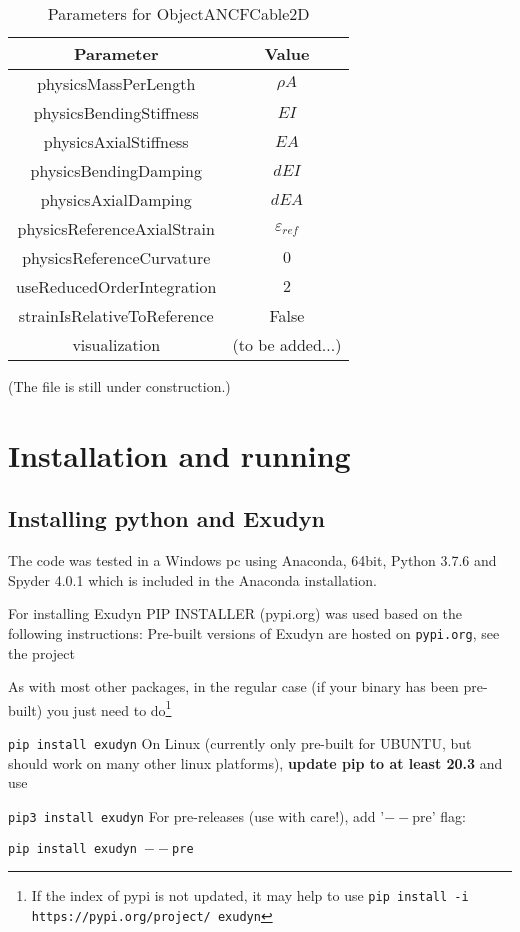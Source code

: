 %
\begin{table}
    \caption{Parameters for ObjectANCFCable2D} \label{tab:ObjectANCFCable2D}
    \centering
    \begin{tabular}{c|c} \hline
        Parameter & Value \\ \hline 
        physicsMassPerLength & $\rho A$\\
        physicsBendingStiffness & $EI$\\
        physicsAxialStiffness & $EA$\\
        physicsBendingDamping & $dEI$\\
        physicsAxialDamping & $dEA$\\
        physicsReferenceAxialStrain  & $\varepsilon_{ref}$\\
        physicsReferenceCurvature & $0$\\
        useReducedOrderIntegration & $2$\\
        strainIsRelativeToReference & False\\
        visualization & (to be added...)\\ \hline
    \end{tabular}
\end{table}
\ei
(The file is still under construction.)
\section{Installation and running}
\subsection{Installing python and Exudyn}
The code was tested in a Windows pc using Anaconda, 64bit, Python 3.7.6 and Spyder 4.0.1 which is included in the Anaconda installation.

For installing Exudyn PIP INSTALLER (pypi.org) was used based on the following instructions:
Pre-built versions of Exudyn are hosted on \texttt{pypi.org}, see the project
\bi
 \item {}
\ei
As with most other packages, in the regular case (if your binary has been pre-built) you just need to do\footnote{If the index of pypi is not updated, it may help to use \texttt{pip install -i https://pypi.org/project/ exudyn} }
\bi
  \item[] \texttt{pip install exudyn}
\ei
On Linux (currently only pre-built for UBUNTU, but should work on many other linux platforms), {\bf update pip to at least 20.3} and use 
\bi
  \item[] \texttt{pip3 install exudyn}
\ei
For pre-releases (use with care!), add '$--$pre' flag:
\bi
  \item[] \texttt{pip install exudyn $--$pre}
\ei  
  
